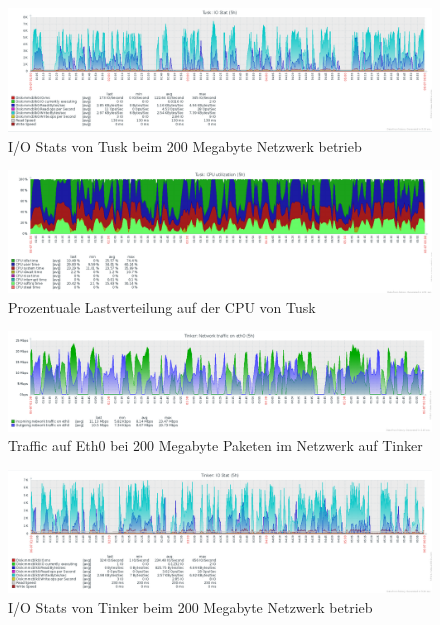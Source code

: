 \begin{figure}[htbp]
\centering
\includegraphics*[width=0.9\linewidth, angle=90]{Abb/ZabbixTusk/Standard/IoStatStandard200}

\caption{I/O Stats von Tusk beim 200 Megabyte Netzwerk betrieb}
\label{fig:IoStatTusk200}
\end{figure} %

\begin{figure}[htbp]
\centering
\includegraphics*[width=0.9\linewidth, angle=90]{Abb/ZabbixTusk/Standard/CPUStandard200}

\caption{Prozentuale Lastverteilung auf der CPU von Tusk}
\label{fig:CPUTusk200}
\end{figure}

\begin{figure}[htbp]
\centering
\includegraphics*[width=0.9\linewidth, angle=90]{Abb/ZabbixTinker/Standard/Standard200}

\caption{Traffic auf Eth0 bei 200 Megabyte Paketen im Netzwerk auf Tinker}
\label{fig:Eth0Tinker200}
\end{figure}


\begin{figure}[htbp]
\centering
\includegraphics*[width=0.9\linewidth, angle=90]{Abb/ZabbixTinker/Standard/IoStatStandard200}

\caption{I/O Stats von Tinker beim 200 Megabyte Netzwerk betrieb}
\label{fig:IoStatTinker200}
\end{figure} %

